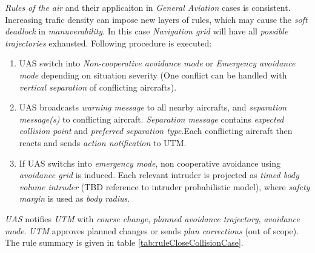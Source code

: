 \emph{Rules of the air} and their applicaiton in \emph{General Aviation} cases is consistent. Increasing trafic density can impose new layers of rules, which may cause the \emph{soft deadlock} in \emph{manuverability}. In this case \emph{Navigation grid} will have all  \emph{possible trajectories} exhausted. Following procedure is executed:
\begin{enumerate}
    \item UAS switch into \emph{Non-cooperative avoidance mode} or \emph{Emergency avoidance mode} depending on situation severity (One conflict can be handled with \emph{vertical separation} of conflicting aircrafts).
    \item UAS broadcasts \emph{warning message} to all nearby aircrafts, and \emph{separation message(s)} to conflicting aircraft. \emph{Separation message} contains \emph{expected collision point} and \emph{preferred separation type}.Each conflicting aircraft then reacts and sends \emph{action notification} to UTM.
    \item If UAS switchs into \emph{emergency mode}, non cooperative avoidance using \emph{avoidance grid} is induced. Each relevant intruder is projected as \emph{timed body volume intruder} (TBD reference to intruder probabilistic model), where \emph{safety margin} is used as \emph{body radius}.
\end{enumerate}

\noindent\emph{UAS} notifies \emph{UTM} with \emph{course change}, \emph{planned avoidance trajectory}, \emph{avoidance mode}. \emph{UTM} approves planned changes or sends \emph{plan corrections} (out of scope). The rule summary is given in table \ref{tab:ruleCloseCollisionCase}. 


\newpage


